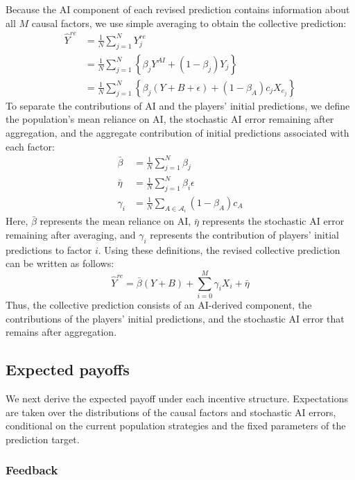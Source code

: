 \documentclass[12pt]{article}
\begin{document}
Because the AI component of each revised prediction contains information about all $M$ causal factors, we use simple averaging to obtain the collective prediction:
\begin{align}
\hat{Y}^{re}
&= \frac{1}{N}\sum_{j = 1}^N Y_j^{re}\\
&= \frac{1}{N}\sum_{j = 1}^N\left\{\beta_jY^{AI} + (1-\beta_j)Y_j\right\}\\
&= \frac{1}{N}\sum_{j = 1}^N\left\{\beta_j(Y + B + \epsilon) + (1 - \beta_A)c_jX_{e_j}\right\}
\end{align}
To separate the contributions of AI and the players' initial predictions, we define the population's mean reliance on AI, the stochastic AI error remaining after aggregation, and the aggregate contribution of initial predictions associated with each factor:
\begin{align}
\bar{\beta} &= \frac{1}{N}\sum_{j = 1}^{N} \beta_j\\
\bar{\eta} &= \frac{1}{N}\sum_{j = 1}^{N} \beta_i\epsilon\\
\label{eta}
\gamma_i &= \frac{1}{N}\sum_{A \in \mathcal{A}_i}(1-\beta_A)c_A
\end{align}
Here, $\bar{\beta}$ represents the mean reliance on AI, $\bar{\eta}$ represents the stochastic AI error remaining after averaging, and $\gamma_i$ represents the contribution of players' initial predictions to factor $i$. 
Using these definitions, the revised collective prediction can be written as follows:
\begin{equation}
\hat{Y}^{re} = \bar{\beta}(Y + B) + \sum_{i = 0}^{M}\gamma_iX_i + \bar{\eta}
\end{equation}
Thus, the collective prediction consists of an AI-derived component, the contributions of the players' initial predictions, and the stochastic AI error that remains after aggregation.

\subsection{Expected payoffs}

We next derive the expected payoff under each incentive structure. 
Expectations are taken over the distributions of the causal factors and stochastic AI errors, conditional on the current population strategies and the fixed parameters of the prediction target.

\subsubsection*{Feedback}
\end{document}
